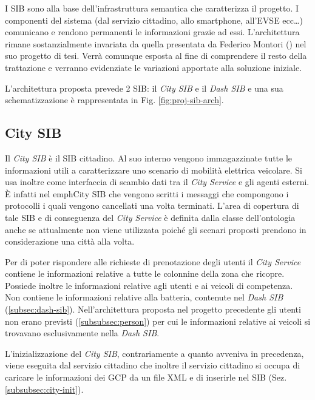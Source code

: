 I SIB sono alla base dell'infrastruttura semantica che caratterizza il progetto. I componenti del sistema (dal servizio cittadino, allo smartphone, all'EVSE ecc\dots) comunicano e rendono permanenti le informazioni grazie ad essi. L'architettura rimane sostanzialmente invariata da quella presentata da Federico Montori (\cite{montori2012}) nel suo progetto di tesi. Verrà comunque esposta al fine di comprendere il resto della trattazione e verranno evidenziate le variazioni apportate alla soluzione iniziale.

L'architettura proposta prevede 2 SIB: il \emph{City SIB} e il \emph{Dash SIB} e una sua schematizzazione è rappresentata in Fig. \ref{fig:proj-sib-arch}.

\subsection{City SIB}\label{subsec:city-sib}

Il \emph{City SIB} è il SIB cittadino. Al suo interno vengono immagazzinate tutte le informazioni utili a caratterizzare uno scenario di mobilità elettrica veicolare. Si usa inoltre come interfaccia di scambio dati tra il \emph{City Service} e gli agenti esterni. È infatti nel emph{City SIB} che vengono scritti i messaggi che compongono i protocolli i quali vengono cancellati una volta terminati. L'area di copertura di tale SIB e di conseguenza del \emph{City Service} è definita dalla classe dell'ontologia  anche se attualmente non viene utilizzata poiché gli scenari proposti prendono in considerazione una città alla volta.

Per di poter rispondere alle richieste di prenotazione degli utenti il \emph{City Service} contiene le informazioni relative a tutte le colonnine della zona che ricopre. Possiede inoltre le informazioni relative agli utenti e ai veicoli di competenza. Non contiene le informazioni relative alla batteria, contenute nel \emph{Dash SIB} (\ref{subsec:dash-sib}). Nell'architettura proposta nel progetto precedente gli utenti non erano previsti (\ref{subsubsec:person}) per cui le informazioni relative ai veicoli si trovavano esclusivamente nella \emph{Dash SIB}.

L'inizializzazione del \emph{City SIB}, contrariamente a quanto avveniva in precedenza, viene eseguita dal servizio cittadino che inoltre il servizio cittadino si occupa di caricare le informazioni dei GCP da un file XML e di inserirle nel SIB (Sez. \ref{subsubsec:city-init}).

